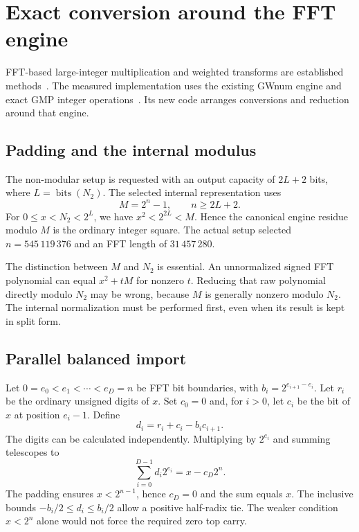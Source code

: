\documentclass[11pt,a4paper]{article}
\theoremstyle{definition}
\newcommand{\bits}{\operatorname{bits}}
\begin{document}
\section{Exact conversion around the FFT engine}
\label{sec:fft}

FFT-based large-integer multiplication and weighted transforms are established
methods~\cite{crandallfagin}. The measured implementation uses the existing
GWnum engine and exact GMP integer operations~\cite{gimpssoftware,gmp}.
Its new code arranges conversions and reduction around that engine.

\subsection{Padding and the internal modulus}

The non-modular setup is requested with an output capacity of $2L+2$ bits,
where $L=\bits(N_2)$. The selected internal representation uses
\[
 M=2^n-1,\qquad n\ge2L+2.
\]
For $0\le x<N_2<2^L$, we have $x^2<2^{2L}<M$. Hence the canonical
engine residue modulo $M$ is the ordinary integer square. The actual setup
selected $n=545\,119\,376$ and an FFT length of $31\,457\,280$.

The distinction between $M$ and $N_2$ is essential. An unnormalized signed
FFT polynomial can equal $x^2+tM$ for nonzero $t$. Reducing that raw
polynomial directly modulo $N_2$ may be wrong, because $M$ is generally
nonzero modulo $N_2$. The internal normalization must be performed first,
even when its result is kept in split form.

\subsection{Parallel balanced import}

Let $0=e_0<e_1<\cdots<e_D=n$ be FFT bit boundaries, with
$b_i=2^{e_{i+1}-e_i}$. Let $r_i$ be the ordinary unsigned digits of $x$.
Set $c_0=0$ and, for $i>0$, let $c_i$ be the bit of $x$ at position
$e_i-1$. Define
\begin{equation}\label{eq:balancedimport}
 d_i=r_i+c_i-b_i c_{i+1}.
\end{equation}
The digits can be calculated independently. Multiplying by $2^{e_i}$ and
summing telescopes to
\[
 \sum_{i=0}^{D-1}d_i2^{e_i}=x-c_D2^n.
\]
The padding ensures $x<2^{n-1}$, hence $c_D=0$ and the sum equals $x$.
The inclusive bounds $-b_i/2\le d_i\le b_i/2$ allow a positive half-radix
tie. The weaker condition $x<2^n$ alone would not force the required
zero top carry.
\end{document}
